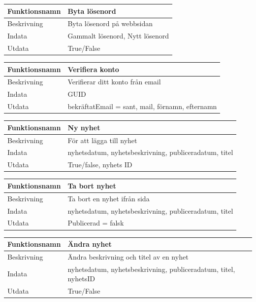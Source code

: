 \documentclass[11pt, titlepage, oneside, a4paper]{article}	%
\begin{document}
\begin{tabular}{ll}
\hline
Funktionsnamn & Byta lösenord                    \\ \hline
Beskrivning   & Byta lösenord på webbsidan \\ \hline
Indata        & Gammalt lösenord, Nytt lösenord   \\ \hline
Utdata        & True/False              \\ \hline
\end{tabular}

\begin{tabular}{ll}
\hline
Funktionsnamn & Verifiera konto                    \\ \hline
Beskrivning   & Verifierar ditt konto från email  \\ \hline
Indata        & GUID   \\ \hline
Utdata        & bekräftatEmail = sant, mail, förnamn, efternamn    \\ \hline
\end{tabular}

\begin{tabular}{ll}
\hline
Funktionsnamn & Ny nyhet                    \\ \hline
Beskrivning   & För att lägga till nyhet \\ \hline
Indata        & nyhetsdatum, nyhetsbeskrivning, publiceradatum, titel \\ \hline
Utdata        & True/false, nyhets ID              \\ \hline
\end{tabular}

\begin{tabular}{ll}
\hline
Funktionsnamn & Ta bort nyhet                   \\ \hline
Beskrivning   & Ta bort en nyhet ifrån sida \\ \hline
Indata        & nyhetsdatum, nyhetsbeskrivning, publiceradatum, titel \\ \hline
Utdata        & Publicerad = falsk            \\ \hline
\end{tabular}

\begin{tabular}{ll}
\hline
Funktionsnamn & Ändra nyhet                   \\ \hline
Beskrivning   & Ändra beskrivning och titel av en nyhet \\ \hline
Indata        & nyhetsdatum, nyhetsbeskrivning, publiceradatum, titel, nyhetsID \\ \hline
Utdata        & True/False            \\ \hline
\end{tabular}
\end{document}
